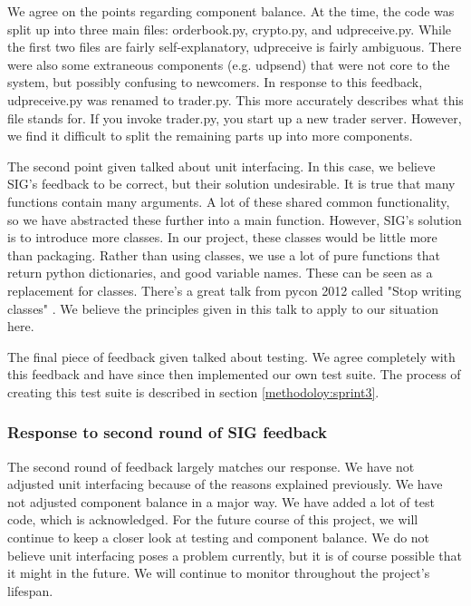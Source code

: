 We agree on the points regarding component balance.
At the time, the code was split up into three main files: orderbook.py, crypto.py, and udpreceive.py.
While the first two files are fairly self-explanatory, udpreceive is fairly ambiguous.
There were also some extraneous components (e.g. udpsend) that were not core to the system, but possibly confusing to newcomers.
In response to this feedback, udpreceive.py was renamed to trader.py.
This more accurately describes what this file stands for.
If you invoke trader.py, you start up a new trader server.
However, we find it difficult to split the remaining parts up into more components.

The second point given talked about unit interfacing.
In this case, we believe SIG's feedback to be correct, but their solution undesirable.
It is true that many functions contain many arguments.
A lot of these shared common functionality, so we have abstracted these further into a main function.
However, SIG's solution is to introduce more classes.
In our project, these classes would be little more than packaging.
Rather than using classes, we use a lot of pure functions that return python dictionaries, and good variable names.
These can be seen as a replacement for classes.
There's a great talk from pycon 2012 called "Stop writing classes" \cite{noclassesvid}.
We believe the principles given in this talk to apply to our situation here.

The final piece of feedback given talked about testing.
We agree completely with this feedback and have since then implemented our own test suite.
The process of creating this test suite is described in section \ref{methodoloy:sprint3}.

\subsubsection{Response to second round of SIG feedback}
The second round of feedback largely matches our response.
We have not adjusted unit interfacing because of the reasons explained previously.
We have not adjusted component balance in a major way.
We have added a lot of test code, which is acknowledged.
For the future course of this project, we will continue to keep a closer look at testing and component balance.
We do not believe unit interfacing poses a problem currently, but it is of course possible that it might in the future.
We will continue to monitor throughout the project's lifespan.
